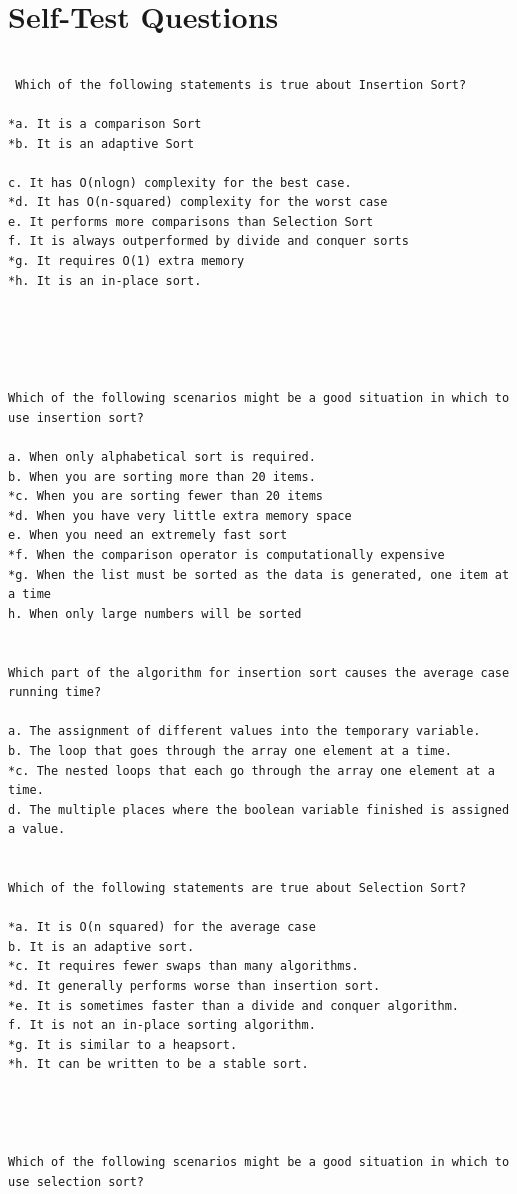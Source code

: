 \section{Self-Test Questions}

\begin{verbatim}

 Which of the following statements is true about Insertion Sort? 

*a. It is a comparison Sort 
*b. It is an adaptive Sort

c. It has O(nlogn) complexity for the best case. 
*d. It has O(n-squared) complexity for the worst case 
e. It performs more comparisons than Selection Sort 
f. It is always outperformed by divide and conquer sorts 
*g. It requires O(1) extra memory 
*h. It is an in-place sort. 





Which of the following scenarios might be a good situation in which to use insertion sort? 

a. When only alphabetical sort is required. 
b. When you are sorting more than 20 items. 
*c. When you are sorting fewer than 20 items 
*d. When you have very little extra memory space 
e. When you need an extremely fast sort 
*f. When the comparison operator is computationally expensive 
*g. When the list must be sorted as the data is generated, one item at a time 
h. When only large numbers will be sorted 


Which part of the algorithm for insertion sort causes the average case running time? 

a. The assignment of different values into the temporary variable. 
b. The loop that goes through the array one element at a time. 
*c. The nested loops that each go through the array one element at a time. 
d. The multiple places where the boolean variable finished is assigned a value. 


Which of the following statements are true about Selection Sort? 

*a. It is O(n squared) for the average case 
b. It is an adaptive sort. 
*c. It requires fewer swaps than many algorithms. 
*d. It generally performs worse than insertion sort. 
*e. It is sometimes faster than a divide and conquer algorithm. 
f. It is not an in-place sorting algorithm. 
*g. It is similar to a heapsort. 
*h. It can be written to be a stable sort. 




Which of the following scenarios might be a good situation in which to use selection sort? 


\end{verbatim}
